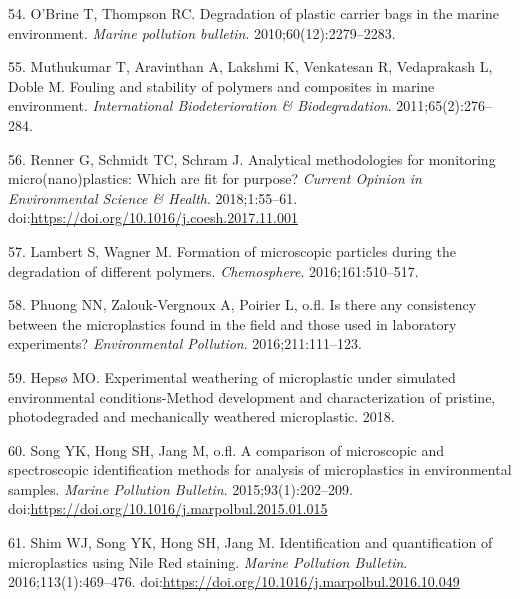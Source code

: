 \documentclass[icelandic,]{book}
\begin{document}
\leavevmode\hypertarget{ref-o2010degradation}{}%
54. O'Brine T, Thompson RC. Degradation of plastic carrier bags in the marine environment. \emph{Marine pollution bulletin}. 2010;60(12):2279--2283.

\leavevmode\hypertarget{ref-muthukumar2011fouling}{}%
55. Muthukumar T, Aravinthan A, Lakshmi K, Venkatesan R, Vedaprakash L, Doble M. Fouling and stability of polymers and composites in marine environment. \emph{International Biodeterioration \& Biodegradation}. 2011;65(2):276--284.

\leavevmode\hypertarget{ref-RENNER201855}{}%
56. Renner G, Schmidt TC, Schram J. Analytical methodologies for monitoring micro(nano)plastics: Which are fit for purpose? \emph{Current Opinion in Environmental Science \& Health}. 2018;1:55--61. doi:\href{https://doi.org/https://doi.org/10.1016/j.coesh.2017.11.001}{https://doi.org/10.1016/j.coesh.2017.11.001}

\leavevmode\hypertarget{ref-lambert2016formation}{}%
57. Lambert S, Wagner M. Formation of microscopic particles during the degradation of different polymers. \emph{Chemosphere}. 2016;161:510--517.

\leavevmode\hypertarget{ref-phuong2016there}{}%
58. Phuong NN, Zalouk-Vergnoux A, Poirier L, o.fl. Is there any consistency between the microplastics found in the field and those used in laboratory experiments? \emph{Environmental Pollution}. 2016;211:111--123.

\leavevmode\hypertarget{ref-hepso2018experimental}{}%
59. Hepsø MO. Experimental weathering of microplastic under simulated environmental conditions-Method development and characterization of pristine, photodegraded and mechanically weathered microplastic. 2018.

\leavevmode\hypertarget{ref-SONG2015202}{}%
60. Song YK, Hong SH, Jang M, o.fl. A comparison of microscopic and spectroscopic identification methods for analysis of microplastics in environmental samples. \emph{Marine Pollution Bulletin}. 2015;93(1):202--209. doi:\href{https://doi.org/https://doi.org/10.1016/j.marpolbul.2015.01.015}{https://doi.org/10.1016/j.marpolbul.2015.01.015}

\leavevmode\hypertarget{ref-SHIM2016469}{}%
61. Shim WJ, Song YK, Hong SH, Jang M. Identification and quantification of microplastics using Nile Red staining. \emph{Marine Pollution Bulletin}. 2016;113(1):469--476. doi:\href{https://doi.org/https://doi.org/10.1016/j.marpolbul.2016.10.049}{https://doi.org/10.1016/j.marpolbul.2016.10.049}
\end{document}
